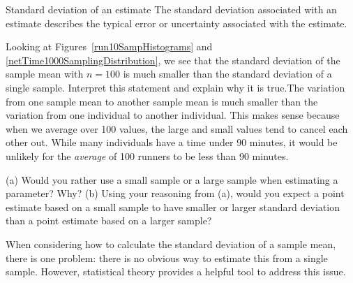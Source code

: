 \begin{onebox}{Standard deviation of an estimate}
The standard deviation associated with an estimate describes the typical error or uncertainty associated with the estimate.\end{onebox}

\begin{examplewrap}
\begin{nexample}{Looking at Figures~\ref{run10SampHistograms} and \ref{netTime1000SamplingDistribution}, we see that the standard deviation of the sample mean with $n=100$ is much smaller than the standard deviation of a single sample. Interpret this statement and explain why it is true.}The variation from one sample mean to another sample mean is much smaller than the variation from one individual to another individual. This makes sense because when we average over 100 values, the large and small values tend to cancel each other out. While many individuals have a time under 90 minutes, it would be unlikely for the \emph{average} of 100 runners to be less than 90 minutes.
\end{nexample}
\end{examplewrap}

\begin{exercisewrap}
\begin{nexercise}
(a) Would you rather use a small sample or a large sample when estimating a parameter? Why? (b) Using your reasoning from (a), would you expect a point estimate based on a small sample to have smaller or larger standard deviation than a point estimate based on a larger sample?\footnotemark
\end{nexercise}
\end{exercisewrap}

When considering how to calculate the standard deviation of a sample mean, there is one problem: there is no obvious way to estimate this from a single sample. However, statistical theory provides a helpful tool to address this issue.

